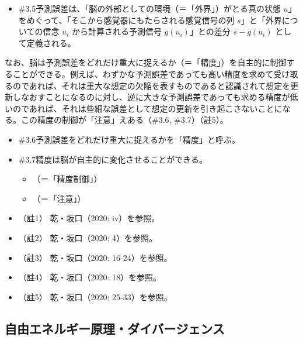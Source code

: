 \begin{note}{}
  \begin{itemize}
    \tightlist
    \item{\#3.5}予測誤差は、「脳の外部としての環境（＝「外界」）がとる真の状態 $u$」をめぐって、「そこから感覚器にもたらされる感覚信号の列 $s$」と「外界についての信念 $u_i$ から計算される予測信号 $g(u_i)$」との差分 $s-g(u_i)$ として定義される。
  \end{itemize}
\end{note}

なお、脳は予測誤差をどれだけ重大に捉えるか（＝「精度」）を自主的に制御することができる。例えば、わずかな予測誤差であっても高い精度を求めて受け取るのであれば、それは重大な想定の欠陥を表すものであると認識されて想定を更新しなおすことになるのに対し、逆に大きな予測誤差であっても求める精度が低いのであれば、それは些細な誤差として想定の更新を引き起こさないことになる。この精度の制御が「注意」えある（\#3.6,
\#3.7）（註5）。

\begin{note}{}
  \begin{itemize}
    \tightlist
    \item{\#3.6}予測誤差をどれだけ重大に捉えるかを「精度」と呼ぶ。
    \item{\#3.7}精度は脳が自主的に変化させることができる。
      \begin{itemize}
        \tightlist
        \item （＝「精度制御」）
        \item （＝「注意」）
      \end{itemize}
  \end{itemize}
\end{note}

\begin{itemize}
\tightlist
\item
  （註1） 乾・坂口（2020: iv）\cite{InuiAndSakaguchi}を参照。
\item
  （註2） 乾・坂口（2020: 4）\cite{InuiAndSakaguchi}を参照。
\item
  （註3） 乾・坂口（2020: 16-24）\cite{InuiAndSakaguchi}を参照。
\item
  （註4） 乾・坂口（2020: 18）\cite{InuiAndSakaguchi}を参照。
\item
  （註5） 乾・坂口（2020: 25-33）\cite{InuiAndSakaguchi}を参照。
\end{itemize}

\subsection{自由エネルギー原理・ダイバージェンス}\label{ux81eaux7531ux30a8ux30cdux30ebux30aeux30fcux539fux7406ux30c0ux30a4ux30d0ux30fcux30b8ux30a7ux30f3ux30b9}

